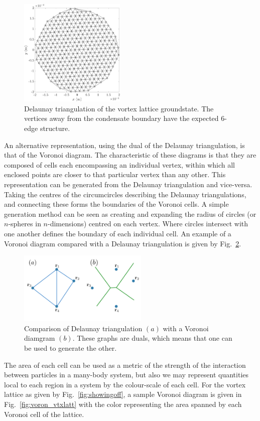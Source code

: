 {\begin{figure}\centering
    \includegraphics[width=0.45\textwidth]{Images/ch4_vtx/Del_tr_VTXLATT}
    \caption{Delaunay triangulation of the vortex lattice groundstate. The vertices away from the condensate boundary have the expected 6-edge structure.}\label{fig:delaun_vtxlatt}
\end{figure}

An alternative representation, using the dual of the Delaunay triangulation, is that of the Voronoi diagram. The characteristic of these diagrams is that they are composed of cells each encompassing an individual vertex, within which all enclosed points are closer to that particular vertex than any other. This representation can be generated from the Delaunay triangulation and vice-versa. Taking the centres of the circumcircles describing the Delaunay triangulations, and connecting these forms the boundaries of the Voronoi cells. A simple generation method can be seen as creating and expanding the radius of circles (or $n$-spheres in $n$-dimensions) centred on each vertex. Where circles intersect with one another defines the boundary of each individual cell. An example of a Voronoi diagram compared with a Delaunay triangulation is given by Fig.~\ref{fig:Voronoi}.
\begin{figure}\centering
    \includegraphics[width=0.55\textwidth]{Images/ch6_phasegineer/imgs/Voronoi}
    \caption{Comparison of Delaunay triangulation $(a)$ with a Voronoi diamgram $(b)$. These graphs are duals, which means that one can be used to generate the other.}\label{fig:Voronoi}
\end{figure}
The area of each cell can be used as a metric of the strength of the interaction between particles in a many-body system, but also we may represent quantities local to each region in a system by the colour-scale of each cell. For the vortex lattice as given by Fig.~\ref{fig:showingoff}, a sample Voronoi diagram is given in Fig.~\ref{fig:voron_vtxlatt} with the color representing the area spanned by each Voronoi cell of the lattice.

}

